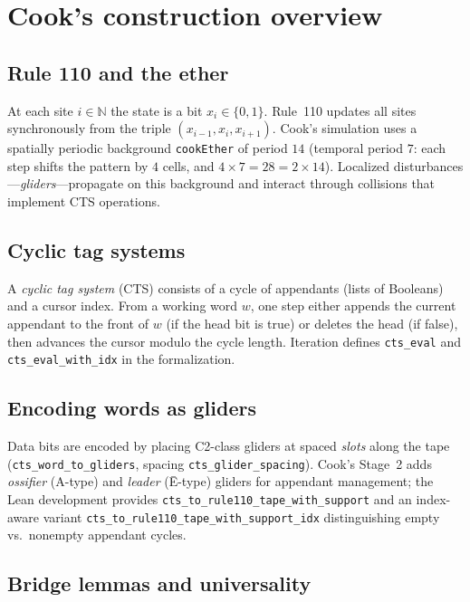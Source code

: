 \documentclass[11pt]{article}
\theoremstyle{remark}
\begin{document}
\section{Cook's construction overview}
\label{sec:cook}

\subsection{Rule 110 and the ether}

At each site $i \in \mathbb{N}$ the state is a bit $x_i \in \{0,1\}$.
Rule~110 updates all sites synchronously from the triple $(x_{i-1},x_i,x_{i+1})$.
Cook's simulation uses a spatially periodic background \texttt{cookEther} of period $14$
(temporal period $7$: each step shifts the pattern by $4$ cells, and $4 \times 7 = 28 = 2 \times 14$).
Localized disturbances---\emph{gliders}---propagate on this background and interact through
collisions that implement CTS operations.

\subsection{Cyclic tag systems}

A \emph{cyclic tag system} (CTS) consists of a cycle of appendants (lists of Booleans)
and a cursor index.
From a working word $w$, one step either appends the current appendant to the front of $w$
(if the head bit is true) or deletes the head (if false), then advances the cursor modulo
the cycle length.
Iteration defines \texttt{cts\_eval} and \texttt{cts\_eval\_with\_idx} in the formalization.

\subsection{Encoding words as gliders}

Data bits are encoded by placing C2-class gliders at spaced \emph{slots} along the tape
(\texttt{cts\_\allowbreak{}word\_\allowbreak{}to\_\allowbreak{}gliders}, spacing \texttt{cts\_glider\_spacing}).
Cook's Stage~2 adds \emph{ossifier} (A-type) and \emph{leader} (Ē-type) gliders for
appendant management; the Lean development provides
\texttt{cts\_to\_rule110\_tape\_with\_support} and an index-aware variant
\texttt{cts\_to\_rule110\_tape\_\allowbreak with\_support\_idx} distinguishing empty vs.\ nonempty
appendant cycles.

\subsection{Bridge lemmas and universality}
\end{document}
